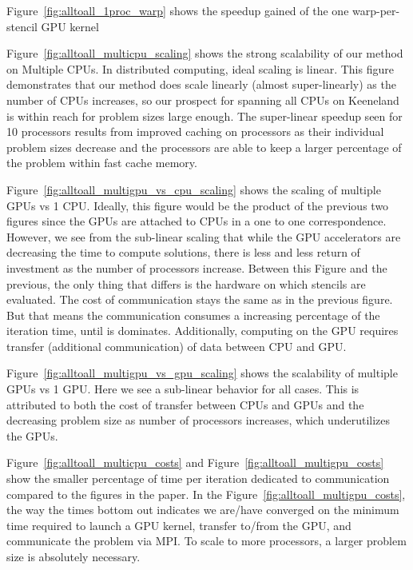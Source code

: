 Figure~\ref{fig:alltoall_1proc_warp} shows the speedup gained of the one warp-per-stencil GPU kernel

Figure~\ref{fig:alltoall_multicpu_scaling}  shows the strong scalability of our method on Multiple CPUs. In distributed computing, ideal scaling is linear. This figure demonstrates that our method does scale linearly (almost super-linearly) as the number of CPUs increases, so our prospect for spanning all CPUs on Keeneland is within reach for problem sizes large enough. The super-linear speedup seen for 10 processors results from improved caching on processors as their individual problem sizes decrease and the processors are able to keep a larger percentage of the problem within fast cache memory.

Figure~\ref{fig:alltoall_multigpu_vs_cpu_scaling}  shows the scaling of multiple GPUs vs 1 CPU. Ideally, this figure would be the product of the previous two figures since the GPUs are attached to CPUs in a one to one correspondence. However, we see from the sub-linear scaling that while the GPU accelerators are decreasing the time to compute solutions, there is less and less return of investment as the number of processors increase. Between this Figure and the previous, the only thing that differs is the hardware on which stencils are evaluated. The cost of communication stays the same as in the previous figure. But that means the communication consumes a increasing percentage of the iteration time, until is dominates. 
Additionally, computing on the GPU requires transfer (additional communication) of data between CPU and GPU. 

Figure~\ref{fig:alltoall_multigpu_vs_gpu_scaling} shows the scalability of multiple GPUs vs 1 GPU. Here we see a sub-linear behavior for all cases. This is attributed to both the cost of transfer between CPUs and GPUs and the decreasing problem size as number of processors increases, which underutilizes the GPUs. 


Figure~\ref{fig:alltoall_multicpu_costs} and Figure~\ref{fig:alltoall_multigpu_costs} show the smaller percentage of time per iteration dedicated to communication compared to the figures in the paper. In the Figure~\ref{fig:alltoall_multigpu_costs}, the way the times bottom out indicates we are/have converged on the minimum time required to launch a GPU kernel, transfer to/from the GPU, and communicate the problem via MPI. To scale to more processors, a larger problem size is absolutely necessary.


